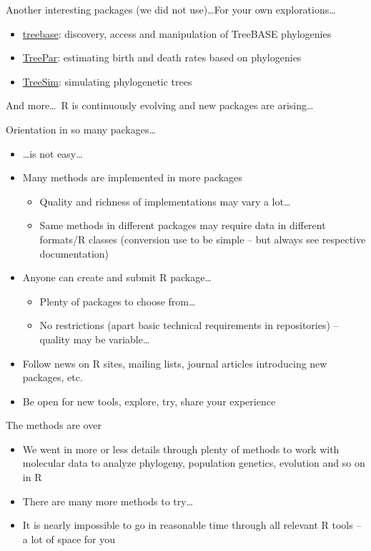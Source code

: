 \documentclass[compress, ucs, xelatex, 11pt, xcolor=svgnames,
  hyperref={
    bookmarks=true,
    unicode=true,
    colorlinks=true,
    pdftitle={Molecular data in R},
    plainpages=false,
    pdfauthor={Vojtech Zeisek},
    pdfsubject={Course about phylogeny and evolution in R},
    pdfcreator={XeLaTeX},
    pdfkeywords={R, evolution, phylogeny, molecular data},
    linkcolor=Tomato,
    anchorcolor=SaddleBrown,
    citecolor=Goldenrod,
    filecolor=DarkMagenta,
    menucolor=Sienna,
    urlcolor=DarkTurquoise,
    pdftex},
  url={hyphens, lowtilde} %
  ]{beamer}
\begin{document}
\begin{frame}[allowframebreaks]{Another interesting packages (we did not use)\ldots}{For your own explorations\ldots}
\begin{itemize}
    \item \href{https://cran.r-project.org/package=treebase}{treebase}:  discovery, access and manipulation of TreeBASE phylogenies
    \item \href{https://cran.r-project.org/package=TreePar}{TreePar}: estimating birth and death rates based on phylogenies
    \item \href{https://cran.r-project.org/package=TreeSim}{TreeSim}: simulating phylogenetic trees
  \end{itemize}
  And more\ldots~R is continuously evolving and new packages are arising\ldots
\end{frame}

\begin{frame}{Orientation in so many packages\ldots}
  \begin{itemize}
    \item \ldots is not easy\ldots
    \item Many methods are implemented in more packages
    \begin{itemize}
      \item Quality and richness of implementations may vary a lot\ldots
      \item Same methods in different packages may require data in different formats/R classes (conversion use to be simple -- but always see respective documentation)
    \end{itemize}
    \item Anyone can create and submit R package\ldots
    \begin{itemize}
      \item Plenty of packages to choose from\ldots
      \item No restrictions (apart basic technical requirements in repositories) -- quality may be variable\ldots
    \end{itemize}
    \item Follow news on R sites, mailing lists, journal articles introducing new packages, etc.
    \item Be open for new tools, explore, try, share your experience
  \end{itemize}
\end{frame}

\begin{frame}{The methods are over}
  \begin{itemize}
    \item We went in more or less details through plenty of methods to work with molecular data to analyze phylogeny, population genetics, evolution and so on in R
    \item There are many more methods to try\ldots
    \item It is nearly impossible to go in reasonable time through all relevant R tools -- a lot of space for you
  \end{itemize}
\end{frame}
\end{document}
